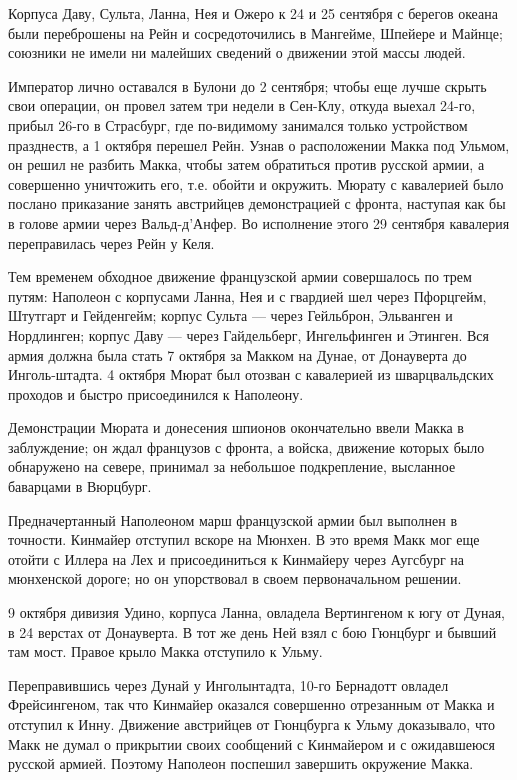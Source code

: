 \documentclass[
  oneside,
  12pt,
  titlepage]{book}
\begin{document}
Корпуса Даву, Сульта, Ланна, Нея и Ожеро к 24 и 25 сентября с берегов океана были переброшены на Рейн и сосредоточились в Мангейме, Шпейере и Майнце; союзники не имели ни малейших сведений о движении этой массы людей.

Император лично оставался в Булони до 2 сентября; чтобы еще лучше скрыть свои операции, он провел затем три недели в Сен-Клу, откуда выехал 24-го, прибыл 26-го в Страсбург, где по-видимому занимался только устройством празднеств, а 1 октября перешел Рейн. Узнав о расположении Макка под Ульмом, он решил не разбить Макка, чтобы затем обратиться против русской армии, а совершенно уничтожить его, т.е. обойти и окружить. Мюрату с кавалерией было послано приказание занять австрийцев демонстрацией с фронта, наступая как бы в голове армии через Вальд-д'Анфер. Во исполнение этого 29 сентября кавалерия переправилась через Рейн у Келя.

Тем временем обходное движение французской армии совершалось по трем путям: Наполеон с корпусами Ланна, Нея и с гвардией шел через Пфорцгейм, Штутгарт и Гейденгейм; корпус Сульта --- через Гейльброн, Эльванген и Нордлинген; корпус Даву --- через Гайдельберг, Ингельфинген и Этинген. Вся армия должна была стать 7 октября за Макком на Дунае, от Донауверта до Инголь-штадта. 4 октября Мюрат был отозван с кавалерией из шварцвальдских проходов и быстро присоединился к Наполеону.

Демонстрации Мюрата и донесения шпионов окончательно ввели Макка в заблуждение; он ждал французов с фронта, а войска, движение которых было обнаружено на севере, принимал за небольшое подкрепление, высланное баварцами в Вюрцбург.

Предначертанный Наполеоном марш французской армии был выполнен в точности. Кинмайер отступил вскоре на Мюнхен. В это время Макк мог еще отойти с Иллера на Лех и присоединиться к Кинмайеру через Аугсбург на мюнхенской дороге; но он упорствовал в своем первоначальном решении.

9 октября дивизия Удино, корпуса Ланна, овладела Вертингеном к югу от Дуная, в 24 верстах от Донауверта. В тот же день Ней взял с бою Гюнцбург и бывший там мост. Правое крыло Макка отступило к Ульму.

Переправившись через Дунай у Инголынтадта, 10-го Бернадотт овладел Фрейсингеном, так что Кинмайер оказался совершенно отрезанным от Макка и отступил к Инну. Движение австрийцев от Гюнцбурга к Ульму доказывало, что Макк не думал о прикрытии своих сообщений с Кинмайером и с ожидавшеюся русской армией. Поэтому Наполеон поспешил завершить окружение Макка.
\end{document}

